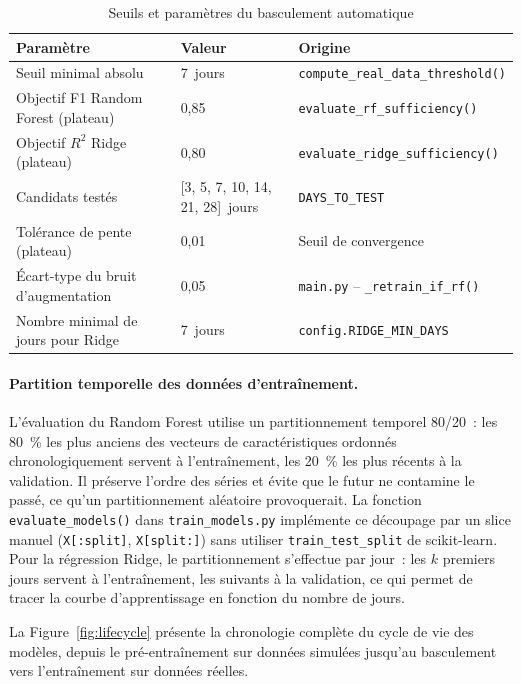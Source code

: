 \begin{table}[htbp]
\centering
\renewcommand{\arraystretch}{1.45}
\caption{Seuils et paramètres du basculement automatique}
\label{tab:basculement}
\begin{tabular}{|p{}|p{}|p{}|}
\hline
\rowcolor{gray!25}
\textbf{Paramètre} & \textbf{Valeur} & \textbf{Origine} \\
\hline
Seuil minimal absolu & 7~jours & \texttt{compute\_real\_data\_threshold()} \\
\hline
Objectif F1 Random Forest (plateau) & 0,85 & \texttt{evaluate\_rf\_sufficiency()} \\
\hline
Objectif \(R^2\) Ridge (plateau) & 0,80 & \texttt{evaluate\_ridge\_sufficiency()} \\
\hline
Candidats testés & [3, 5, 7, 10, 14, 21, 28]~jours & \texttt{DAYS\_TO\_TEST} \\
\hline
Tolérance de pente (plateau) & 0,01 & Seuil de convergence \\
\hline
Écart-type du bruit d'augmentation & 0,05 & \texttt{main.py} -- \texttt{\_retrain\_if\_rf()} \\
\hline
Nombre minimal de jours pour Ridge & 7~jours & \texttt{config.RIDGE\_MIN\_DAYS} \\
\hline
\end{tabular}
\end{table}

\paragraph{Partition temporelle des données d'entraînement.}
L'évaluation du Random Forest utilise un partitionnement temporel 80/20~: les 80~\% les plus anciens des vecteurs de caractéristiques ordonnés chronologiquement servent à l'entraînement, les 20~\% les plus récents à la validation. Il préserve l'ordre des séries et évite que le futur ne contamine le passé, ce qu'un partitionnement aléatoire provoquerait. La fonction \texttt{evaluate\_models()} dans \texttt{train\_models.py} implémente ce découpage par un slice manuel (\texttt{X[:split]}, \texttt{X[split:]}) sans utiliser \texttt{train\_test\_split} de scikit-learn. Pour la régression Ridge, le partitionnement s'effectue par jour~: les \(k\) premiers jours servent à l'entraînement, les suivants à la validation, ce qui permet de tracer la courbe d'apprentissage en fonction du nombre de jours.

La Figure~\ref{fig:lifecycle} présente la chronologie complète du cycle de vie des modèles, depuis le pré-entraînement sur données simulées jusqu'au basculement vers l'entraînement sur données réelles.

